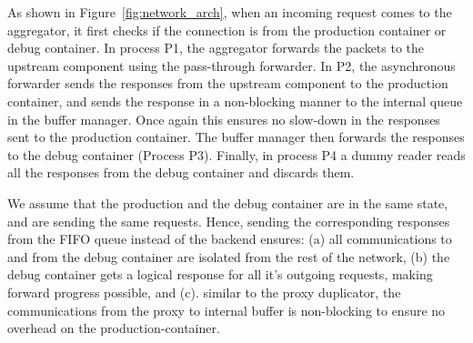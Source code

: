 As shown in  Figure~\ref{fig:network_arch}, when an incoming request comes to the aggregator, it first checks if the connection is from the production container or debug container. 
In process P1, the aggregator forwards the packets to the upstream component using the pass-through forwarder.
In P2, the asynchronous forwarder sends the responses from the upstream component to the production container, and sends the response in a non-blocking manner to the internal queue in the buffer manager. 
Once again this ensures no slow-down in the responses sent to the production container.
The buffer manager then forwards the responses to the debug container (Process P3).
Finally, in process P4 a dummy reader reads all the responses from the debug container and discards them.


We assume that the production and the debug container are in the same state, and are sending the same requests. 
Hence, sending the corresponding responses from the FIFO queue instead of the backend ensures:
(a) all communications to and from the debug container are isolated from the rest of the network,
(b) the debug container gets a logical response for all it's outgoing requests, making forward progress possible,
and (c). similar to the proxy duplicator, the communications from the proxy to internal buffer is non-blocking to ensure no overhead on the production-container.


